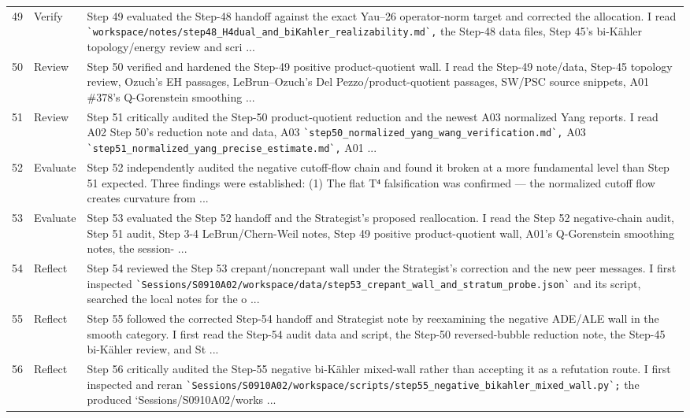 \documentclass[UTF8,fontset=fandol,zihao=-4]{ctexart}
\begin{document}
\begin{longtable}{r p{} >{\raggedright\arraybackslash}p{}}
49 & Verify & Step 49 evaluated the Step-48 handoff against the exact Yau--26 operator-norm target and corrected the allocation. I read \nolinkurl{`workspace/notes/step48_H4dual_and_biKahler_realizability.md`,} the Step-48 data files, Step 45's bi-Kähler topology/energy review and scri ...\\
50 & Review & Step 50 verified and hardened the Step-49 positive product-quotient wall. I read the Step-49 note/data, Step-45 topology review, Ozuch's EH passages, LeBrun--Ozuch's Del Pezzo/product-quotient passages, SW/PSC source snippets, A01 \#378's Q-Gorenstein smoothing ...\\
51 & Review & Step 51 critically audited the Step-50 product-quotient reduction and the newest A03 normalized Yang reports. I read A02 Step 50's reduction note and data, A03 \nolinkurl{`step50_normalized_yang_wang_verification.md`,} A03 \nolinkurl{`step51_normalized_yang_precise_estimate.md`,} A01 ...\\
52 & Evaluate & Step 52 independently audited the negative cutoff-flow chain and found it broken at a more fundamental level than Step 51 expected. Three findings were established: (1) The flat T⁴ falsification was confirmed — the normalized cutoff flow creates curvature from ...\\
53 & Evaluate & Step 53 evaluated the Step 52 handoff and the Strategist's proposed reallocation. I read the Step 52 negative-chain audit, Step 51 audit, Step 3-4 LeBrun/Chern-Weil notes, Step 49 positive product-quotient wall, A01's Q-Gorenstein smoothing notes, the session- ...\\
54 & Reflect & Step 54 reviewed the Step 53 crepant/noncrepant wall under the Strategist's correction and the new peer messages. I first inspected \nolinkurl{`Sessions/S0910A02/workspace/data/step53_crepant_wall_and_stratum_probe.json`} and its script, searched the local notes for the o ...\\
55 & Reflect & Step 55 followed the corrected Step-54 handoff and Strategist note by reexamining the negative ADE/ALE wall in the smooth category. I first read the Step-54 audit data and script, the Step-50 reversed-bubble reduction note, the Step-45 bi-Kähler review, and St ...\\
56 & Reflect & Step 56 critically audited the Step-55 negative bi-Kähler mixed-wall rather than accepting it as a refutation route. I first inspected and reran \nolinkurl{`Sessions/S0910A02/workspace/scripts/step55_negative_bikahler_mixed_wall.py`;} the produced `Sessions/S0910A02/works ...\\

\end{longtable}
\end{document}
